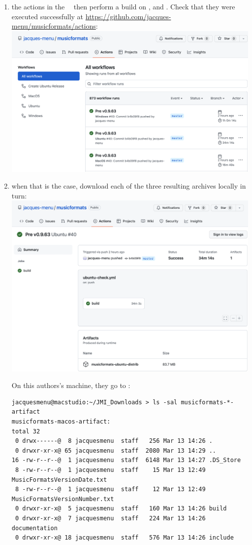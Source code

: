 \begin{enumerate}
\item the actions in the \mf\ \repo\ then perform a build on \Linux, \Windows and \MacOS. Check that they were executed successfully at \url{https://github.com/jacques-menu/musicformats/actions}:\\
\includegraphics[scale=0.5]{../mfgraphics/SuccessfulActions.png}


\item when that is the case, download each of the three resulting  archives locally in turn:\\
\includegraphics[scale=0.5]{../mfgraphics/DownloadDistribution.png}

On this authors's machine, they go to :
\begin{lstlisting}[language=Terminal]
jacquesmenu@macstudio:~/JMI_Downloads > ls -sal musicformats-*-artifact
musicformats-macos-artifact:
total 32
 0 drwx------@  8 jacquesmenu  staff   256 Mar 13 14:26 .
 0 drwxr-xr-x@ 65 jacquesmenu  staff  2080 Mar 13 14:29 ..
16 -rw-r--r--@  1 jacquesmenu  staff  6148 Mar 13 14:27 .DS_Store
 8 -rw-r--r--@  1 jacquesmenu  staff    15 Mar 13 12:49 MusicFormatsVersionDate.txt
 8 -rw-r--r--@  1 jacquesmenu  staff    12 Mar 13 12:49 MusicFormatsVersionNumber.txt
 0 drwxr-xr-x@  5 jacquesmenu  staff   160 Mar 13 14:26 build
 0 drwxr-xr-x@  7 jacquesmenu  staff   224 Mar 13 14:26 documentation
 0 drwxr-xr-x@ 18 jacquesmenu  staff   576 Mar 13 14:26 include


\end{lstlisting}
\end{enumerate}
